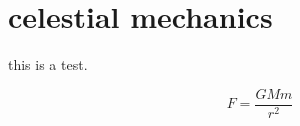 \documentclass[11pt]{article}
\begin{document}
\section{celestial mechanics}

this is a test.

\[
F = \frac{GMm}{r^2}
\]
\end{document}
